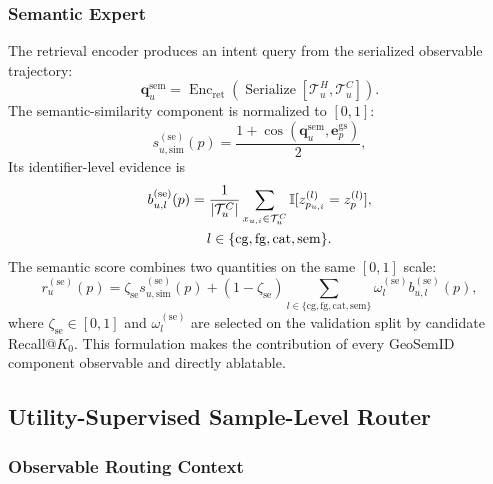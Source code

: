 \documentclass[journal]{IEEEtran}
\newcommand{\Ind}{\mathbb{I}}
\begin{document}
\subsubsection{Semantic Expert}

The retrieval encoder produces an intent query from the serialized observable
trajectory:
\begin{equation}
\bm{q}_{u}^{\mathrm{sem}}
=
\operatorname{Enc}_{\mathrm{ret}}
\left(
\operatorname{Serialize}
\left[\mathcal{T}_{u}^{H},\mathcal{T}_{u}^{C}\right]
\right).
\label{eq:semantic_query}
\end{equation}
The semantic-similarity component is normalized to $[0,1]$:
\begin{equation}
s_{u,\mathrm{sim}}^{(\mathrm{se})}(p)
=
\frac{1+\operatorname{cos}\!\left(
\bm{q}_{u}^{\mathrm{sem}},\bm{e}_{p}^{\mathrm{gs}}
\right)}{2},
\label{eq:semantic_exact}
\end{equation}
Its identifier-level evidence is
\begin{equation}
\begin{aligned}
b_{u,l}^{(\mathrm{se})}(p)
&=
\frac{1}{|\mathcal{T}_{u}^{C}|}
\sum_{x_{u,i}\in\mathcal{T}_{u}^{C}}
\Ind[z_{p_{u,i}}^{(l)}=z_p^{(l)}],\\
&\hspace{1.2em}
 l\in\{\mathrm{cg},\mathrm{fg},\mathrm{cat},\mathrm{sem}\}.
\end{aligned}
\label{eq:semantic_backoff}
\end{equation}
The semantic score combines two quantities on the same $[0,1]$ scale:
\begin{equation}
r_u^{(\mathrm{se})}(p)
=
\zeta_{\mathrm{se}}s_{u,\mathrm{sim}}^{(\mathrm{se})}(p)
+
(1-\zeta_{\mathrm{se}})
\sum_{l\in\{\mathrm{cg},\mathrm{fg},\mathrm{cat},\mathrm{sem}\}}
\omega_l^{(\mathrm{se})}b_{u,l}^{(\mathrm{se})}(p),
\label{eq:semantic_fusion}
\end{equation}
where $\zeta_{\mathrm{se}}\in[0,1]$ and $\omega_l^{(\mathrm{se})}$ are selected
on the validation split by candidate Recall@$K_0$. This formulation makes the
contribution of every GeoSemID component observable and directly ablatable.

\subsection{Utility-Supervised Sample-Level Router}
\label{subsec:router}

\subsubsection{Observable Routing Context}
\end{document}
